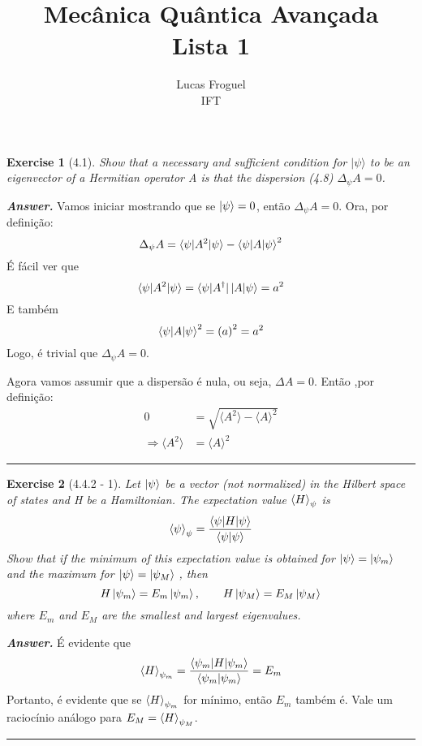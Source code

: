 \documentclass[12pt]{article}
\title{Mecânica Quântica Avançada \\ Lista 1}
\author{Lucas Froguel \\ IFT}
\date{}
\def\be{\begin{equation}}
\def\ee{\end{equation}}
\def\f{\frac}
\def\l{\left}
\def\r{\right}
\newtheorem{exercise}{Exercise}
\newenvironment{answer}{\noindent\textbf{\textit{Answer.}} \normalfont }{\par\noindent\rule{\textwidth}{0.4pt}}
\begin{document}
	\maketitle
	\listoftheorems[title={List of Exercises}]

	\begin{exercise}[4.1]
		Show that a necessary and sufficient condition for $|\psi\rangle$ to be an eigenvector of a Hermitian
		operator A is that the dispersion (4.8) $\Delta_\psi A = 0$.
	\end{exercise}
	\begin{answer}
		Vamos iniciar mostrando que se $\ket{\psi}=0$, então $\Delta_\psi A = 0$. Ora, por definição:
		\be
			\Delta_\psi A = \braket{\psi|A^2|\psi} - \braket{\psi|A|\psi}^2
		\ee
		É fácil ver que
		\be
			\braket{\psi|A^2|\psi} = \bra{\psi|A^\dagger}\ket{A|\psi} = a^2
		\ee
		E também
		\be
			\braket{\psi|A|\psi}^2 = \l(a\r)^2 = a^2
		\ee
		Logo, é trivial que $\Delta_\psi A = 0$. 
		
		Agora vamos assumir que a dispersão é nula, ou seja, $\Delta A = 0$. Então ,por definição:		
		\begin{align}
			0 &= \sqrt{\langle A^2 \rangle - \langle A \rangle^2} \\
			\Rightarrow \langle A^2 \rangle &= \langle A \rangle^2
		\end{align}		
				
	\end{answer}

	\begin{exercise}[4.4.2 - 1]
		 Let $\ket{\psi}$ be a vector (not normalized) in the Hilbert space of states and H be a Hamiltonian. The
		expectation value $\braket{H}_\psi$ is
		\be
			\braket{\psi}_\psi = \f{\braket{\psi|H|\psi}}{\braket{\psi|\psi}}
		\ee
		Show that if the minimum of this expectation value is obtained for $\ket{\psi}=\ket{\psi_m}$ and the maximum for $\ket{\psi}=\ket{\psi_M}$ , then
		\be
			H\ket{\psi_m} = E_m\ket{\psi_m}, \quad\quad H\ket{\psi_M} = E_M\ket{\psi_M}
		\ee 	
		where $E_m$ and $E_M$ are the smallest and largest eigenvalues.
	\end{exercise}
	\begin{answer}
		É evidente que
		\be
			\braket{H}_{\psi_m} = \f{\braket{\psi_m|H|\psi_m}}{\braket{\psi_m|\psi_m}} = E_m
		\ee
		Portanto, é evidente que se $\braket{H}_{\psi_m}$ for mínimo, então $E_m$ também é. Vale um raciocínio análogo para $E_M=\braket{H}_{\psi_M}$. 		
	\end{answer}
	
\end{document}
